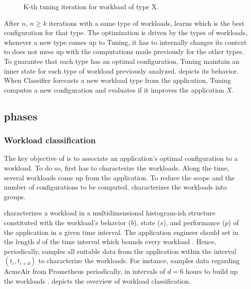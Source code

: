 \begin{figure*}[htp]
    \centering
    \def\svgwidth{\textwidth}
    \scalebox{1.0}{}
    \caption{K-th tuning iteration for workload of type X.}
    \label{fig:tuning-overview}
\end{figure*}

After $n,\, n \geq k$ iterations with a same type of workloads, \name learns
which is the best configuration for that type. The optimization is driven by the
types of workloads, whenever a new type comes up to Tuning, it has to internally
changes its context to does not mess up with the computations made previously
for the other types.  To guarantee that each type has an optimal configuration,
Tuning maintain an inner state for each type of workload previously analyzed.
 depicts its behavior. When Classifier forecasts a new
workload type from the application, Tuning computes a new configuration and
evaluates if it improves the application $X$.

\subsection{\name phases}


\subsubsection{Workload classification}

The key objective of \name is to associate an application's optimal
configuration to a workload. To do so, first \name has to characterize the
workloads. Along the time, several workloads come up from the
application. To reduce the scope and the number of configurations to be
computed, \name characterizes the workloads into groups.

\name characterizes a workload in a multidimensional histogram-ish structure
constituted with the workload's behavior ($b$), state ($s$), and performance
($p$) of the application in a given time interval. The application engineer
should set in \name the length $d$ of the time interval which bounds every
workload . Hence, periodically, \name samples all suitable data from the
application within the interval $(t_i, t_{i+d})$ to characterize the workloads.
For instance, \name samples data regarding AcmeAir from Prometheus periodically,
in intervals of $d = 6$ hours to build up the workloads .
 depicts the overview of workload
classification.

